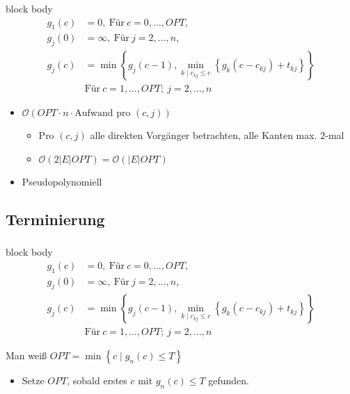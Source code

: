 \documentclass{beamer}
\begin{document}
\begin{frame}
   \frametitle{\insertsection}
   \framesubtitle{\insertsubsection}
   \begin{beamercolorbox}[center,wd=\paperwidth]{block body}
      \begin{align*}
         g_1(c) & =  0, ~ \text{Für} ~ c = 0,\ldots,OPT, \\
         g_j(0) & =  \infty, ~ \text{Für} ~ j = 2,\ldots,n, \\
         g_j(c) & =  \min\left\{g_j(c-1), \min_{k \mid c_{kj} \le c}\left\{g_k(c-c_{kj}) + t_{kj}\right\}\right\} \\
                & \text{Für} ~ c= 1,\ldots,OPT; ~ j = 2,\ldots,n
      \end{align*}
   \end{beamercolorbox}

   \begin{itemize}
      \item $\mathcal{O}(OPT\cdot n \cdot \text{Aufwand pro $(c,j)$})$
         \begin{itemize}
            \item Pro $(c,j)$ alle direkten Vorgänger betrachten, alle Kanten
               max. $2$-mal
            \item $\mathcal{O}\left(2|E| OPT\right) = \mathcal{O}\left(|E| OPT\right)$
         \end{itemize}
      \item Pseudopolynomiell
   \end{itemize}

\end{frame}

\subsection{Terminierung}

\begin{frame}
   \frametitle{\insertsection}
   \framesubtitle{\insertsubsection}

   \begin{beamercolorbox}[center,wd=\paperwidth]{block body}
      \begin{align*}
         g_1(c) & =  0, ~ \text{Für} ~ c = 0,\ldots,OPT, \\
         g_j(0) & =  \infty, ~ \text{Für} ~ j = 2,\ldots,n, \\
         g_j(c) & =  \min\left\{g_j(c-1), \min_{k \mid c_{kj} \le c}\left\{g_k(c-c_{kj}) + t_{kj}\right\}\right\} \\
                & \text{Für} ~ c= 1,\ldots,OPT; ~j = 2,\ldots,n
      \end{align*}
   \end{beamercolorbox}

   Man weiß $OPT=\min\left\{c \mid g_n(c) \le T\right\}$
   \begin{itemize}
      \item Setze $OPT$, sobald erstes $c$ mit $g_n(c)\le T$ gefunden.
   \end{itemize}
\end{frame}
\end{document}
